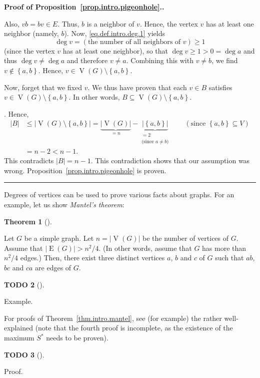 \documentclass[numbers=enddot,12pt,final,onecolumn,notitlepage]{scrartcl}%
\theoremstyle{definition}
\newtheorem{theo}{Theorem}[subsection]
\newenvironment{theorem}[1][]
{\begin{theo}[#1]\begin{leftbar}}
{\end{leftbar}\end{theo}}
\newtheorem{quest}[theo]{TODO}
\newenvironment{todo}[1][]
{\begin{quest}[#1]\begin{leftbar}}
{\end{leftbar}\end{quest}}
\newenvironment{proof}[1][Proof]{\noindent\textbf{#1.} }{\ \rule{0.5em}{0.5em}}
\newcommand{\set}[1]{\left\{ #1 \right\}}
\newcommand{\abs}[1]{\left| #1 \right|}
\newcommand{\verts}[1]{\operatorname{V}\left( #1 \right)}
\newcommand{\edges}[1]{\operatorname{E}\left( #1 \right)}
\newcommand{\underbrack}[2]{\underbrace{#1}_{\substack{#2}}}
\begin{document}
\begin{proof}[Proof of Proposition~\ref{prop.intro.pigeonhole}.]
{Also, $vb = bv \in E$. Thus, $b$ is a neighbor of $v$. Hence, the
vertex $v$ has at least one neighbor (namely, $b$).
Now, \eqref{eq.def.intro.deg.1} yields
\[
\deg v = \left(\text{the number of all neighbors of } v\right)
\geq 1
\]
(since the vertex $v$ has at least one neighbor), so that
$\deg v \geq 1 > 0 = \deg a$ and thus $\deg v \neq \deg a$ and
therefore $v \neq a$. Combining this with $v \neq b$, we find
$v \notin \set{a, b}$. Hence, $v \in \verts{G} \setminus \set{a, b}$.

Now, forget that we fixed $v$. We thus have proven that each $v \in B$
satisfies $v \in \verts{G} \setminus \set{a, b}$. In other words,
$B \subseteq \verts{G} \setminus \set{a, b}$.}. Hence,
\begin{align*}
\abs{B} &\leq \abs{\verts{G} \setminus \set{a, b}}
= \underbrace{\abs{\verts{G}}}_{= n}
- \underbrack{\abs{\set{a, b}}}{
                = 2 \\ \text{(since } a \neq b \text{)}}
\qquad \left(\text{since } \set{a, b} \subseteq V \right) \\
&= n - 2 < n - 1 .
\end{align*}
This contradicts $\abs{B} = n - 1$. This contradiction shows that our
assumption was wrong. Proposition~\ref{prop.intro.pigeonhole} is
proven.
\end{proof}

Degrees of vertices can be used to prove various facts about graphs.
For an example, let us show \textit{Mantel's theorem}:

\begin{theorem} \label{thm.intro.mantel}
Let $G$ be a simple graph. Let $n = \abs{\verts{G}}$ be the number of
vertices of $G$. Assume that $\abs{\edges{G}} > n^2 / 4$. (In other
words, assume that $G$ has more than $n^2 / 4$ edges.) Then, there
exist three distinct vertices $a$,
$b$ and $c$ of $G$ such that $ab$, $bc$ and $ca$ are edges of $G$.
\end{theorem}

\begin{todo}
Example.
\end{todo}

For proofs of Theorem~\ref{thm.intro.mantel}, see (for example) the
rather well-explained \cite{Choo16} (note that the fourth proof is
incomplete, as the existence of the maximum $S^*$ needs to be proven).

\begin{todo}
Proof.
\end{todo}
\end{document}
